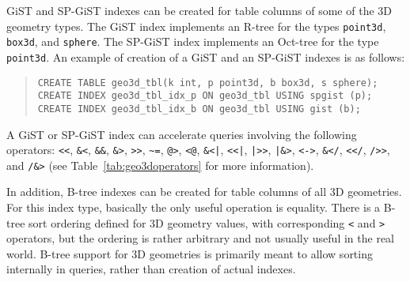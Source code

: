 \documentclass[10pt]{article}
\begin{document}
GiST and SP-GiST indexes can be created for table columns of some of the 3D geometry types.
The GiST index implements an R-tree for the types 
\verb+point3d+, \verb+box3d+, and \verb+sphere+. 
The SP-GiST index implements an Oct-tree for the type \verb+point3d+.
An example of creation of a GiST and an SP-GiST indexes is as follows:

\begin{quote}
\begin{verbatim}
CREATE TABLE geo3d_tbl(k int, p point3d, b box3d, s sphere);
CREATE INDEX geo3d_tbl_idx_p ON geo3d_tbl USING spgist (p);
CREATE INDEX geo3d_tbl_idx_b ON geo3d_tbl USING gist (b);
\end{verbatim}
\end{quote}

A GiST or SP-GiST index can accelerate queries involving the following operators: 
\verb+<<+, \verb+&<+, \verb+&&+, \verb+&>+, \verb+>>+, \verb+~=+, \verb+@>+, \verb+<@+, \verb+&<|+, 
\verb+<<|+, \verb+|>>+, \verb+|&>+, \verb+<->+, \verb+&</+, \verb+<</+, \verb+/>>+, and \verb+/&>+ 
(see Table~\ref{tab:geo3doperators} for more information).

In addition, B-tree indexes can be created for table columns of all 3D geometries. 
For this index type, basically the only useful operation is equality. 
There is a B-tree sort ordering defined for 3D geometry values, with corresponding 
\verb+<+ and \verb+>+ operators, but the ordering is rather arbitrary and 
not usually useful in the real world. B-tree support for 3D geometries 
is primarily meant to allow sorting internally in queries, 
rather than creation of actual indexes.
\end{document}
